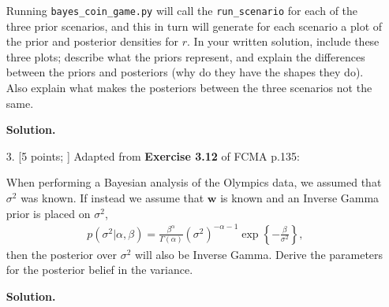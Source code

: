 \documentclass[10pt]{article}
\begin{document}
\begin{itemize}
Running {\tt bayes\_coin\_game.py} will call the {\tt run\_scenario} for each of the three prior scenarios, and this in turn will generate for each scenario a plot of the prior and posterior densities for $r$. In your written solution, include these three plots; describe what the priors represent, and explain the differences between the priors and posteriors (why do they have the shapes they do). Also explain what makes the posteriors between the three scenarios not the same.

{\bf Solution.}



\item[3.]  [5 points; \boldred{Required only for Graduates}]
Adapted from {\bf Exercise 3.12} of FCMA p.135:

When performing a Bayesian analysis of the Olympics data, we assumed that $\sigma^2$ was known.  If instead we assume that $\mathbf{w}$ is known and an Inverse Gamma prior is placed on $\sigma^2$,
\begin{eqnarray*}
p(\sigma^2 | \alpha, \beta) = \frac{\beta^{\alpha}}{\Gamma(\alpha)} (\sigma^2)^{-\alpha-1} \exp \left\{-\frac{\beta}{\sigma^2} \right\},
\end{eqnarray*}
then the posterior over $\sigma^2$ will also be Inverse Gamma. Derive the parameters for the posterior belief in the variance.  

{\bf Solution.}


\end{itemize}
\end{document}
